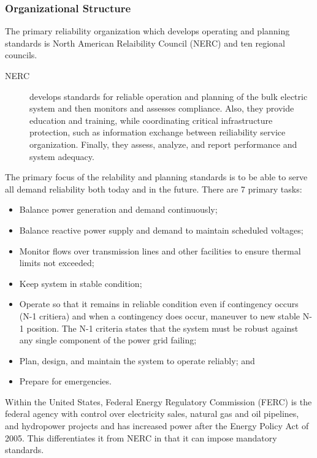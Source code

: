 \subsubsection{Organizational Structure}
The primary reliability organization which develops operating and planning standards is North American Relaibility Council (NERC) and ten regional councils. 
\begin{description}
\item[NERC] develops standards for reliable operation and planning of the bulk electric system and then monitors and assesses compliance.  Also, they provide education and training, while coordinating critical infrastructure protection, such as information exchange between reiliability service organization.  Finally, they assess, analyze, and report performance and system adequacy.
\end{description}
 The primary focus of the relability and planning standards is to be able to serve all demand reliability both today and in the future.  There are 7 primary tasks:
\begin{itemize}
\item Balance power generation and demand continuously;
\item Balance reactive power supply and demand to maintain scheduled voltages;
\item Monitor flows over transmission lines and other facilities to ensure thermal limits not exceeded;
\item Keep system in stable condition;
\item Operate so that it remains in reliable condition even if contingency occurs (N-1 critiera) and when a contingency does occur, maneuver to new stable N-1 position. The N-1 criteria states that the system must be robust against any single component of the power grid failing;
\item Plan, design, and maintain the system to operate reliably; and
\item Prepare for emergencies.
\end{itemize}

Within the United States, Federal Energy Regulatory Commission (FERC) is the federal agency with control over electricity sales, natural gas and oil pipelines, and hydropower projects and has increased power after the  Energy Policy Act of 2005.  This differentiates it from NERC in that it can impose mandatory standards.

